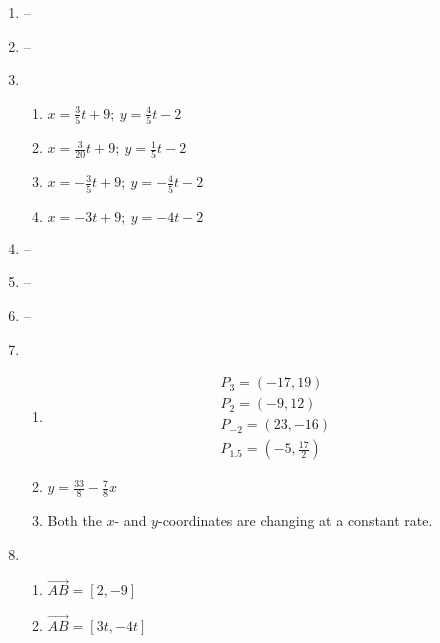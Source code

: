 \documentclass{article}
\begin{document}
\begin{enumerate}
\item --

\item --

\item

	\begin{enumerate}
	
	\item $x = \frac{3}{5} t + 9; \ y = \frac{4}{5} t - 2$
		
	\item $x = \frac{3}{20} t + 9; \ y = \frac{1}{5} t - 2$
		
	\item $x = -\frac{3}{5} t + 9; \ y = -\frac{4}{5} t - 2$
	
	\item $x = -3t + 9; \ y = -4t - 2$
		
	\end{enumerate}
	
\item --

\item --

\item --

\item 

	\begin{enumerate}
	
	\item 
		\begin{gather*}
		P_3 = (-17, 19) \\
		P_2 = (-9, 12) \\
		P_{-2} = (23, -16) \\
		P_{1.5} = (-5, \frac{17}{2})
		\end{gather*}
		
	\item $y = \frac{33}{8} - \frac{7}{8}x$
	
	\item Both the $x$- and $y$-coordinates are changing at a constant rate.
	
	\end{enumerate}
	
\item

	\begin{enumerate}
	
	\item $\vec{AB} = [2, -9]$
	
	\item $\vec{AB} = [3t, -4t]$
	

\end{enumerate}
\end{enumerate}
\end{document}

